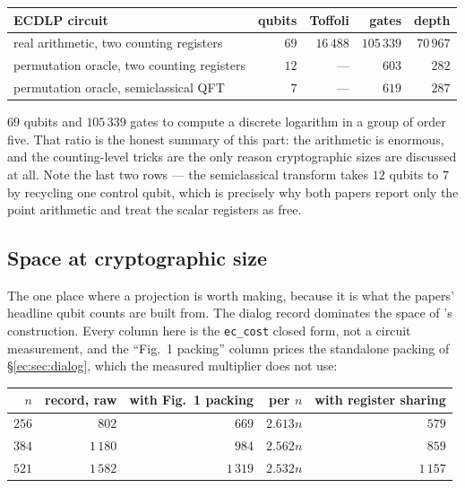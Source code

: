 \documentclass[11pt]{article}
\newcommand{\code}[1]{\texttt{#1}}
\theoremstyle{plain}
\theoremstyle{remark}
\begin{document}
\begin{center}\small
\begin{tabular}{@{}lrrrr@{}}
\toprule
ECDLP circuit & qubits & Toffoli & gates & depth\\
\midrule
real arithmetic, two counting registers & $69$ & $16\,488$ & $105\,339$ & $70\,967$\\
permutation oracle, two counting registers & $12$ & --- & $603$ & $282$\\
permutation oracle, semiclassical QFT & $7$ & --- & $619$ & $287$\\
\bottomrule
\end{tabular}
\end{center}

\noindent
$69$ qubits and $105\,339$ gates to compute a discrete logarithm in a group of order
five. That ratio is the honest summary of this part: the arithmetic is enormous, and the
counting-level tricks are the only reason cryptographic sizes are discussed at all. Note the last
two rows --- the semiclassical transform takes $12$ qubits to $7$ by recycling one
control qubit, which is precisely why both papers report only the point arithmetic and treat the
scalar registers as free.

\subsection{Space at cryptographic size}\label{ec:sec:space}

The one place where a projection is worth making, because it is what the papers' headline qubit
counts are built from. The dialog record dominates the space of \cite{ec:schrott26}'s construction.
Every column here is the \code{ec\_cost} closed form, not a circuit measurement, and the
``Fig.~1 packing'' column prices the standalone packing of \S\ref{ec:sec:dialog}, which the measured
multiplier does not use:

\begin{center}\small
\begin{tabular}{@{}rrrrr@{}}
\toprule
$n$ & record, raw & with Fig.~1 packing & per $n$ & with register sharing\\
\midrule
$256$ & $802$ & $669$ & $2.613n$ & $579$\\
$384$ & $1\,180$ & $984$ & $2.562n$ & $859$\\
$521$ & $1\,582$ & $1\,319$ & $2.532n$ & $1\,157$\\
\bottomrule
\end{tabular}
\end{center}
\end{document}
